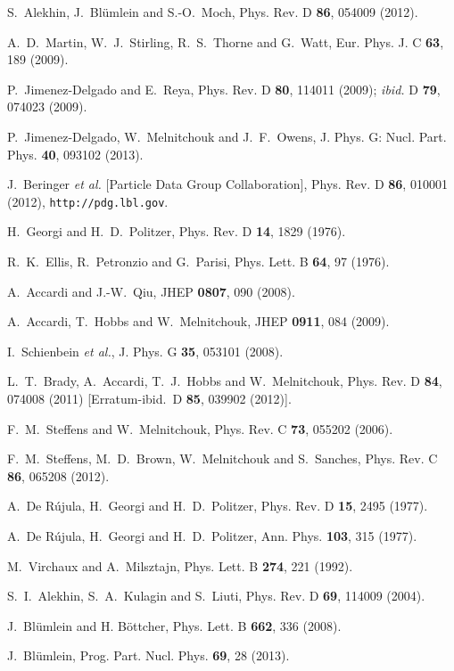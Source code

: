\documentclass[aps,prd,amsmath,preprint]{revtex4}
\begin{document}
\begin{thebibliography}{99}
S.~Alekhin, J.~Bl\"umlein and S.-O.~Moch,
Phys. Rev. D {\bf 86}, 054009 (2012).

A.~D.~Martin, W.~J.~Stirling, R.~S.~Thorne and G.~Watt,
Eur. Phys. J. C {\bf 63}, 189 (2009).

P.~Jimenez-Delgado and E.~Reya,
Phys. Rev. D {\bf 80}, 114011 (2009);
{\it ibid.} D {\bf 79}, 074023 (2009).

P.~Jimenez-Delgado, W.~Melnitchouk and J.~F.~Owens,
J. Phys. G: Nucl. Part. Phys. {\bf 40}, 093102 (2013).

J.~Beringer {\it et al.} [Particle Data Group Collaboration],
Phys. Rev. D {\bf 86}, 010001 (2012),
{\tt http://pdg.lbl.gov}.

H.~Georgi and H.~D.~Politzer,
Phys. Rev. D {\bf 14}, 1829 (1976).

R.~K.~Ellis, R.~Petronzio and G.~Parisi,
Phys. Lett. B {\bf 64}, 97 (1976).

A.~Accardi and J.-W.~Qiu,
JHEP {\bf 0807}, 090 (2008).

A.~Accardi, T.~Hobbs and W.~Melnitchouk,
JHEP {\bf 0911}, 084 (2009).

I.~Schienbein {\it et al.},
J. Phys. G {\bf 35}, 053101 (2008).

L.~T.~Brady, A.~Accardi, T.~J.~Hobbs and W.~Melnitchouk,
Phys. Rev. D {\bf 84}, 074008 (2011)
[Erratum-ibid.\ D {\bf 85}, 039902 (2012)].

F.~M.~Steffens and W.~Melnitchouk,
Phys. Rev. C {\bf 73}, 055202 (2006).

F.~M.~Steffens, M.~D.~Brown, W.~Melnitchouk and S.~Sanches,
Phys. Rev. C {\bf 86}, 065208 (2012).

A.~De R\'ujula, H.~Georgi and H.~D.~Politzer,
Phys. Rev. D {\bf 15}, 2495 (1977).

A.~De R\'ujula, H.~Georgi and H.~D.~Politzer,
Ann. Phys. {\bf 103}, 315 (1977).

M.~Virchaux and A.~Milsztajn,
Phys. Lett. B {\bf 274}, 221 (1992).

S.~I.~Alekhin, S.~A.~Kulagin and S.~Liuti,
Phys. Rev. D {\bf 69}, 114009 (2004).

J.~Bl\"umlein and H. B\"ottcher,
Phys. Lett. B {\bf 662}, 336 (2008).

J.~Bl\"umlein,
Prog. Part. Nucl. Phys. {\bf 69}, 28 (2013).


\end{thebibliography}
\end{document}
